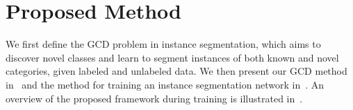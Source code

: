



\section{Proposed Method}
\label{sec:method}
We first define the GCD problem in instance segmentation, which aims to discover novel classes and learn to segment instances of both known and novel categories, given labeled and unlabeled data. We then present our GCD method in~ and the method for training an instance segmentation network in~. An overview of the proposed framework during training is illustrated in~.




